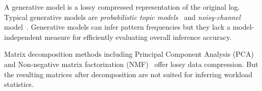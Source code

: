 A generative model is a lossy compressed representation of the original log.
Typical generative models are \textit{probabilistic topic models}~\cite{DBLP:journals/cacm/Blei12,DBLP:conf/acl/WangZLG09} and \textit{noisy-channel} model~\cite{DBLP:journals/ai/KnightM02}.
Generative models can infer pattern frequencies but they lack a model-independent measure for efficiently evaluating overall inference accuracy.

Matrix decomposition methods including Principal Component Analysis (PCA)~\cite{DBLP:reference/stat/Jolliffe11} and Non-negative matrix factorization (NMF)~\cite{lee1999learning} offer lossy data compression.
But the resulting matrices after decomposition are not suited for inferring workload statistics.


